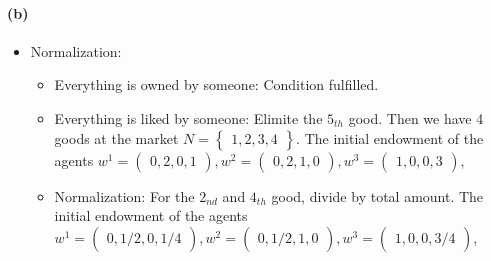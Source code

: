 \documentclass{article}
\newenvironment{answer}{\par\color{ForestGreen}}{\par}
\begin{document}
\begin{answer}
  \paragraph{(b)}
  \begin{itemize}
    \item Normalization:
    \begin{itemize}
      \item Everything is owned by someone: Condition fulfilled.
      \item Everything is liked by someone: Elimite the $5_{th}$ good.
      Then we have 4 goods at the market $ N = \begin{Bmatrix} 1,2,3,4 \end{Bmatrix}$.
      The initial endowment of the agents
      $ w^1 = \begin{pmatrix} 0, 2, 0, 1 \end{pmatrix},
      w^2 = \begin{pmatrix} 0, 2, 1, 0 \end{pmatrix},
      w^3 = \begin{pmatrix} 1, 0, 0, 3 \end{pmatrix}$,
      \item Normalization: For the $2_{nd}$ and $4_{th}$ good, divide by total amount.
      The initial endowment of the agents
      $ w^1 = \begin{pmatrix} 0, 1/2, 0, 1/4 \end{pmatrix},
      w^2 = \begin{pmatrix} 0, 1/2, 1, 0 \end{pmatrix},
      w^3 = \begin{pmatrix} 1, 0, 0, 3/4 \end{pmatrix}$,
    \end{itemize}


\end{itemize}
\end{answer}
\end{document}
